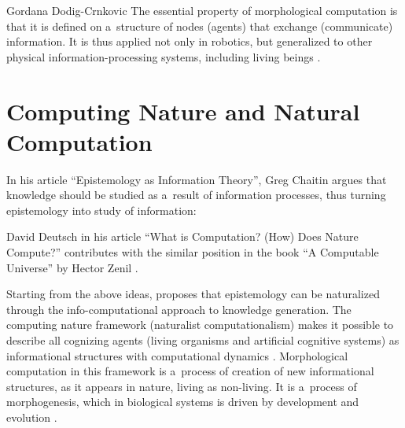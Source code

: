 \begin{artengenv}{Gordana Dodig-Crnkovic}
The essential property of morphological computation is that it is defined on a~structure of nodes (agents) that exchange (communicate) information. It is thus applied not only in robotics, but generalized to other physical information-processing systems, including living beings
\parencites[][]{muller_info-computational_2013}[][]{dodig-crnkovic_morphologically_2017}[][]{dodig-crnkovic_cognition_2018}.%


\section*{Computing Nature and Natural Computation}
In his article ``Epistemology as Information Theory'', Greg Chaitin argues that knowledge should be studied as a~result of information processes, thus turning epistemology into study of information:

David Deutsch in his article ``What is Computation? (How) Does Nature Compute?'' contributes with the similar position in the book ``A Computable Universe'' by Hector Zenil
\parencite*[][]{zenil_computable_2012}.%


Starting from the above ideas,
\parencite[][]{dodig-crnkovic_epistemology_2007} %
 proposes that epistemology can be naturalized through the info-computational approach to knowledge generation. The computing nature framework (naturalist computationalism) makes it possible to describe all cognizing agents (living organisms and artificial cognitive systems) as informational structures with computational dynamics 
\parencites[][]{dodig-crnkovic_information_2011}[][]{dodig-crnkovic_development_2013}[][]{dodig-crnkovic_why_2014}[][]{dodig-crnkovic_computational_2017}[][]{dodig-crnkovic_computing_2013}[][]{dodig-crnkovic_representation_2017}. %
 Morphological computation in this framework is a~process of creation of new informational structures, as it appears in nature, living as non-living. It is a~process of morphogenesis, which in biological systems is driven by development and evolution 
\parencites[][]{muller_info-computational_2013}[][]{dodig-crnkovic_morphologically_2017}[][]{dodig-crnkovic_cognition_2018}.%



\end{artengenv}
